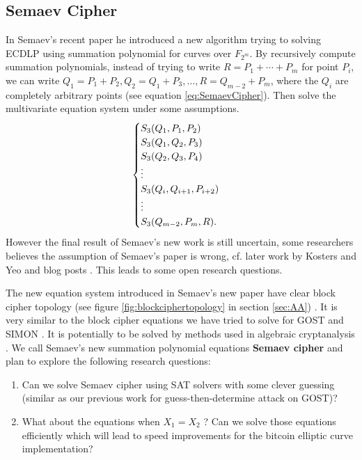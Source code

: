 \subsection{Semaev Cipher} \label{sec:SemaevCipher}
In Semaev's recent paper \cite{cryptoeprint:2015:310} he introduced a new algorithm trying to solving ECDLP using summation polynomial for curves over $F_{2^m}$. By recursively compute summation polynomials, instead of trying to write $R=P_1+\cdots+P_m$ for point $P_i$, we can write $Q_1 = P_1+P_2, Q_2=Q_1+P_3, \dots , R = Q_{m-2}+P_m$, where the $Q_i$ are completely arbitrary points (see equation \ref{eq:SemaevCipher}). Then solve the multivariate equation system under some assumptions. 
\begin{equation}
\label{eq:SemaevCipher}
\begin{cases}
S_3(Q_1,P_1,P_2) \cr
S_3(Q_1,Q_2,P_3) \cr
S_3(Q_2,Q_3,P_4) \cr
\vdots \cr
S_3(Q_i,Q_{i+1},P_{i+2}) \cr
\vdots \cr
S_3(Q_{m-2},P_m,R).
\cr
\end{cases}
\end{equation}
However the final result of Semaev's new work is still uncertain, some researchers believes the assumption of Semaev's paper is wrong, cf. later work by Kosters and Yeo \cite{kosters2015notes} and blog posts \cite{StevenECDLP2015,CourtoisECCPost2015}. This leads to some open research questions. 

The new equation system introduced in Semaev's new paper have clear block cipher topology (see figure \ref{fig:blockciphertopology} in section \ref{sec:AA}) \cite{courtois2002cryptanalysis}. It is very similar to the block cipher equations we have tried to solve for GOST and SIMON \cite{courtois2012contradiction,courtois2014combined}. It is potentially to be solved by methods used in algebraic cryptanalysis \cite{courtois2002cryptanalysis}. We call Semaev's new summation polynomial equations \textbf{Semaev cipher} and plan to explore the following research questions:

\begin{enumerate}
	\item Can we solve Semaev cipher using SAT solvers with some clever guessing (similar as our previous work for guess-then-determine attack on GOST)?  
	\item What about the equations when $X_1=X_2$ ? Can we solve those equations efficiently which will lead to speed improvements for the bitcoin elliptic curve implementation?
\end{enumerate}


